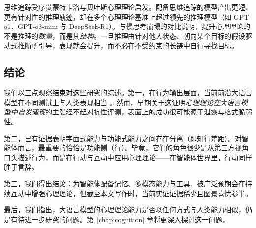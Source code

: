 思维追踪受序贯蒙特卡洛与贝叶斯心理理论启发。配备思维追踪的模型产出更短、更有针对性的推理轨迹，却在多个心理理论基准上超过领先的推理模型（如 GPT-o1、GPT-o3-mini 与 DeepSeek-R1）。与慢思考崩塌的对比说明，提升心理理论的不是推理的\emph{数量}，而是其\emph{结构}。一旦推理由针对他人状态、朝向某个目标的假设驱动式推断所引导，表现就会提升，而不必在不受约束的长链中自行寻找目标。

\subsection{结论}
我们以三点观察结束对这些研究的综述。第一，在行为输出层面，当前前沿大语言模型在不同测试上与人类表现相当 \citep{van2023theory, strachan2024gpt4oreadsmindeyes, jones2024comparing}。然而，早期关于这证明{\em 心理理论在大语言模型中自发涌现}的主张经不起对抗性评测，表面上的成功很可能源于泄露与格式脆弱性。

第二，已有证据表明字面式能力与功能式能力之间存在分离（即知行差距）。对智能体而言，最重要的恰恰是功能侧（行）。毕竟，它们的角色很少是从第三方视角口头描述行为，而是在行动与互动中应用心理理论——在智能体世界里，行动同样胜于言辞。

第三，我们得出结论：为智能体配备记忆、多模态能力与工具，被广泛预期会在持续互动中增强心理理论，但截至本文写作时，当前实证证据稀少且图景喜忧参半。

最后，我们指出，大语言模型的心理理论能力是否以任何方式与人类能力相似，仍是有待进一步研究的问题。第~\ref{chap:cognition} 章将更深入探讨这一问题。



